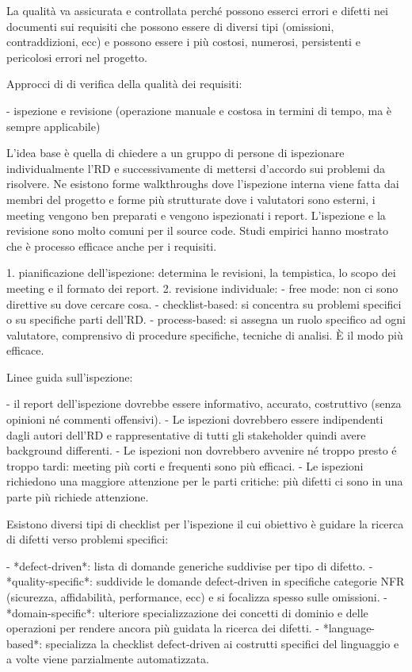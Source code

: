 La qualità va assicurata e controllata perché possono esserci errori e difetti nei documenti sui requisiti che possono essere di diversi tipi (omissioni, contraddizioni, ecc) e possono essere i più costosi, numerosi, persistenti e pericolosi errori nel progetto.

Approcci di di verifica della qualità dei requisiti: 

- ispezione e revisione (operazione manuale e costosa in termini di tempo, ma è sempre applicabile)
 
 L’idea base è quella di chiedere a un gruppo di persone di ispezionare individualmente l’RD e successivamente di mettersi d’accordo sui problemi da risolvere.
 Ne esistono forme walkthroughs dove l’ispezione interna viene fatta dai membri del progetto e forme più strutturate dove i valutatori sono esterni, i meeting vengono ben preparati e vengono ispezionati i report. 
 L’ispezione e la revisione sono molto comuni per il source code. 
 Studi empirici hanno mostrato che è processo efficace anche per i requisiti.
 
 1. pianificazione dell’ispezione: determina le revisioni, la tempistica, lo scopo dei meeting e il formato dei report.
 2. revisione individuale: 
    - free mode: non ci sono direttive su dove cercare cosa.
    - checklist-based: si concentra su problemi specifici o su specifiche parti dell’RD.
    - process-based: si assegna un ruolo specifico ad ogni valutatore, comprensivo di procedure specifiche, tecniche di analisi. È il modo più efficace.
 
 Linee guida sull’ispezione:
 
 - il report dell’ispezione dovrebbe essere informativo, accurato, costruttivo (senza opinioni né commenti offensivi).
 - Le ispezioni dovrebbero essere indipendenti dagli autori dell’RD e rappresentative di tutti gli stakeholder quindi avere background differenti.
 - Le ispezioni non dovrebbero avvenire né troppo presto é troppo tardi: meeting più corti e frequenti sono più efficaci.
 - Le ispezioni richiedono una maggiore attenzione per le parti critiche: più difetti ci sono in una parte più richiede attenzione.
 
 Esistono diversi tipi di checklist per l’ispezione il cui obiettivo è guidare la ricerca di difetti verso problemi specifici: 
 
 - *defect-driven*: lista di domande generiche suddivise per tipo di difetto.
 - *quality-specific*: suddivide le domande defect-driven in specifiche categorie NFR (sicurezza, affidabilità, performance, ecc) e si focalizza spesso sulle omissioni.
 - *domain-specific*: ulteriore specializzazione dei concetti di dominio e delle operazioni per rendere ancora più guidata la ricerca dei difetti.
 - *language-based*: specializza la checklist defect-driven ai costrutti specifici del linguaggio e a volte viene parzialmente automatizzata.
 
